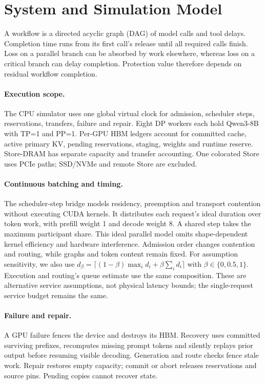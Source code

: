 \section{System and Simulation Model}
\label{sec:model}

A workflow is a directed acyclic graph (DAG) of model calls and tool delays.
Completion time runs from its first call's release until all required calls
finish. Loss on a parallel branch can be absorbed by work elsewhere, whereas
loss on a critical branch can delay completion. Protection value therefore
depends on residual workflow completion.

\paragraph{Execution scope.}
The CPU simulator uses one global virtual clock for admission, scheduler
steps, reservations, transfers, failure and repair. Eight DP workers each
hold Qwen3-8B with TP=1 and PP=1. Per-GPU HBM ledgers account for committed
cache, active primary KV, pending reservations, staging, weights and runtime
reserve. Store-DRAM has separate capacity and transfer accounting. One
colocated Store uses PCIe paths; SSD/NVMe and remote Store are excluded.

\paragraph{Continuous batching and timing.}
The scheduler-step bridge models residency, preemption and transport
contention without executing CUDA kernels. It distributes each request's
ideal duration over token work, with prefill weight 1 and decode weight 8.
A shared step takes the maximum participant share. This ideal parallel
model omits shape-dependent kernel efficiency and hardware interference.
Admission order changes contention and routing, while graphs and token
content remain fixed.
For assumption sensitivity, we also use
$d_{\beta}=\lceil(1-\beta)\max_i d_i+\beta\sum_i d_i\rceil$ with
$\beta\in\{0,0.5,1\}$. Execution and routing's queue estimate use the same
composition. These are alternative service assumptions, not physical latency
bounds; the single-request service budget remains the same.

\paragraph{Failure and repair.}
A GPU failure fences the device and destroys its HBM. Recovery uses
committed surviving prefixes, recomputes missing prompt tokens and silently
replays prior output before resuming visible decoding. Generation and route
checks fence stale work. Repair restores empty capacity; commit or abort
releases reservations and source pins. Pending copies cannot recover state.

